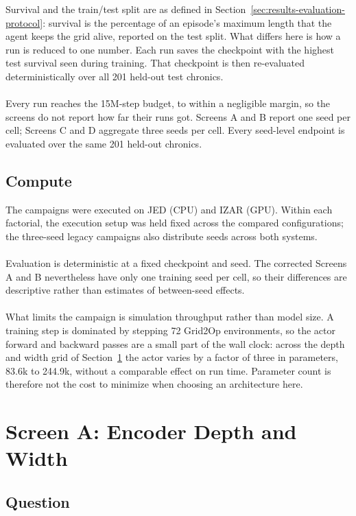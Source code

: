 Survival and the train/test split are as defined in
Section~\ref{sec:results-evaluation-protocol}: survival is the percentage of an
episode's maximum length that the agent keeps the grid alive, reported on the
test split. What differs here is how a run is reduced to one number. Each run saves the checkpoint with the highest test survival seen during training. That checkpoint is then re-evaluated deterministically over all 201 held-out test chronics.
\\
\\
Every run reaches the 15M-step budget, to within a negligible margin, so the
screens do not report how far their runs got. Screens A and B report one seed
per cell; Screens C and D aggregate three seeds per cell. Every seed-level
endpoint is evaluated over the same 201 held-out chronics.

\subsection{Compute}
\label{subsec:screening-budget-alignment}

The campaigns were executed on JED (CPU) and IZAR (GPU). Within each factorial,
the execution setup was held fixed across the compared configurations; the
three-seed legacy campaigns also distribute seeds across both systems.
\\
\\
Evaluation is deterministic at a fixed checkpoint and seed. The corrected
Screens A and B nevertheless have only one training seed per cell, so their
differences are descriptive rather than estimates of between-seed effects.
\\
\\
What limits the campaign is simulation throughput rather than model size. A
training step is dominated by stepping 72 Grid2Op environments, so the actor
forward and backward passes are a small part of the wall clock: across the depth
and width grid of Section~\ref{sec:screen-depth-width} the actor varies by a
factor of three in parameters, 83.6k to 244.9k, without a comparable effect on
run time. Parameter count is therefore not the cost to minimize when choosing an
architecture here.

\section{Screen A: Encoder Depth and Width}
\label{sec:screen-depth-width}

\subsection*{Question}

